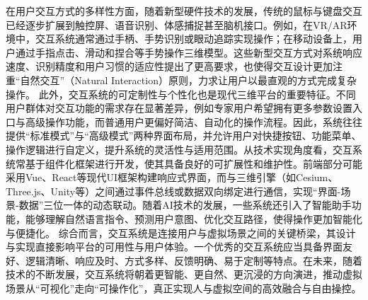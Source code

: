 {{在用户交互方式的多样性方面，随着新型硬件技术的发展，传统的鼠标与键盘交互已经逐步扩展到触控屏、语音识别、体感捕捉甚至脑机接口。例如，在VR/AR环境中，交互系统通常通过手柄、手势识别或眼动追踪实现操作；在移动设备上，用户通过手指点击、滑动和捏合等手势操作三维模型。这些新型交互方式对系统响应速度、识别精度和用户习惯的适应性提出了更高要求，也使得交互设计更加注重``自然交互''（Natural
Interaction）原则，力求让用户以最直观的方式完成复杂操作。
此外，交互系统的可定制性与个性化也是现代三维平台的重要特征。不同用户群体对交互功能的需求存在显著差异，例如专家用户希望拥有更多参数设置入口与高级操作功能，而普通用户更偏好简洁、自动化的操作流程。因此，系统往往提供``标准模式''与``高级模式''两种界面布局，并允许用户对快捷按钮、功能菜单、操作逻辑进行自定义，提升系统的灵活性与适用范围。从技术实现角度看，交互系统常基于组件化框架进行开发，使其具备良好的可扩展性和维护性。前端部分可能采用Vue、React等现代UI框架构建响应式界面，而与三维引擎（如Cesium、Three.js、Unity等）之间通过事件总线或数据双向绑定进行通信，实现``界面-场景-数据''三位一体的动态联动。随着AI技术的发展，一些系统还引入了智能助手功能，能够理解自然语言指令、预测用户意图、优化交互路径，使得操作更加智能化与便捷化。
综合而言，交互系统是连接用户与虚拟场景之间的关键桥梁，其设计与实现直接影响平台的可用性与用户体验。一个优秀的交互系统应当具备界面友好、逻辑清晰、响应及时、方式多样、反馈明确、易于定制等特点。在未来，随着技术的不断发展，交互系统将朝着更智能、更自然、更沉浸的方向演进，推动虚拟场景从``可视化''走向``可操作化''，真正实现人与虚拟空间的高效融合与自由操控。
}}
